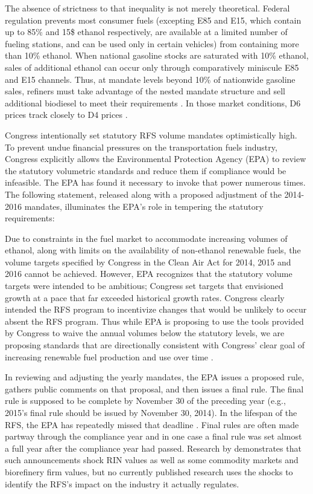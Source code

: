 \documentclass[11pt]{article}
\begin{document}
The absence of strictness to that inequality is not merely theoretical. Federal regulation prevents most consumer fuels (excepting E85 and E15, which contain up to 85\% and 15\$ ethanol respectively, are available at a limited number of fueling stations, and can be used only in certain vehicles) from containing more than 10\% ethanol. When national gasoline stocks are saturated with 10\% ethanol, sales of additional ethanol can occur only through comparatively miniscule E85 and E15 channels. Thus, at mandate levels beyond 10\% of nationwide gasoline sales, refiners must take advantage of the nested mandate structure and sell additional biodiesel to meet their requirements \citep{Korting2019}. In those market conditions, D6 prices track closely to D4 prices \citep{Irwin2014}.

Congress intentionally set statutory RFS volume mandates optimistically high. To prevent undue financial pressures on the transportation fuels industry, Congress explicitly allows the Environmental Protection Agency (EPA) to review the statutory volumetric standards and reduce them if compliance would be infeasible. The EPA has found it necessary to invoke that power numerous times. The following statement, released along with a proposed adjustment of the 2014-2016 mandates, illuminates the EPA's role in tempering the statutory requirements:

\begin{displayquote}
	Due to constraints in the fuel market to accommodate increasing volumes of ethanol, along with limits on the availability of non-ethanol renewable fuels, the volume targets specified by Congress in the Clean Air Act for 2014, 2015 and 2016 cannot be achieved. However, EPA recognizes that the statutory volume targets were intended to be ambitious; Congress set targets that envisioned growth at a pace that far exceeded historical growth rates. Congress clearly intended the RFS program to incentivize changes that would be unlikely to occur absent the RFS program. Thus while EPA is proposing to use the tools provided by Congress to waive the annual volumes below the statutory levels, we are proposing standards that are directionally consistent with Congress' clear goal of increasing renewable fuel production and use over time \citep{EnvironmentalProtectionAgency2015}.
\end{displayquote}

In reviewing and adjusting the yearly mandates, the EPA issues a proposed rule, gathers public comments on that proposal, and then issues a final rule. The final rule is supposed to be complete by November 30 of the preceding year (e.g., 2015's final rule should be issued by November 30, 2014). In the lifespan of the RFS, the EPA has repeatedly missed that deadline \citep{Bracmort2015}. Final rules are often made partway through the compliance year and in one case a final rule was set almost a full year after the compliance year had passed. Research by \cite{Lade2018a} demonstrates that such announcements shock RIN values as well as some commodity markets and biorefinery firm values, but no currently published research uses the shocks to identify the RFS's impact on the industry it actually regulates.
\end{document}
